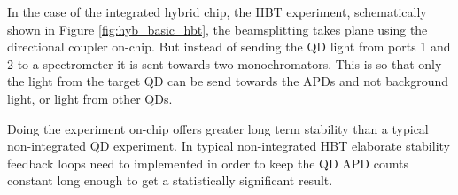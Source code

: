 In the case of the integrated hybrid chip, the HBT experiment, schematically shown in Figure
\ref{fig:hyb_basic_hbt}, the beamsplitting takes plane using the directional
coupler on-chip. But instead of sending the QD light from ports 1 and 2 to a
spectrometer it is sent towards two monochromators. This is so that only the
light from the target QD can be send towards the APDs and not background light,
or light from other QDs.

Doing the experiment on-chip offers greater long term stability than a typical non-integrated QD
experiment. In typical non-integrated HBT elaborate stability feedback loops
need to implemented in order to keep the QD APD counts constant long enough to
get a statistically significant result.
